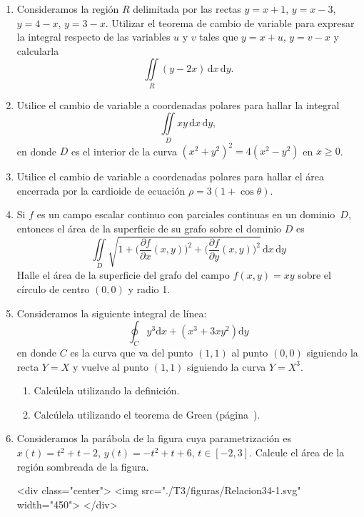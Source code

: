 \begin{enumerate}
\item
Consideramos la región $R$ delimitada por las rectas $y=x+1$, $y=x-3$, $y=4-x$, $y=3-x$.
Utilizar el teorema de cambio de variable para expresar la integral respecto de las variables $u$ y $v$ tales que $y=x+u$, $y=v-x$ y calcularla
\[
\iint\limits_R (y-2x)\,\mathrm dx\,\mathrm dy.
\]

\item
Utilice el cambio de variable a coordenadas polares para hallar la integral
\[
\iint\limits_{\mathit D} xy\,\mathrm dx\,\mathrm dy,
\]
en donde $\mathit D$ es el interior de la curva $(x^2+y^2)^2=4(x^2-y^2)$ en $x\geq 0$.

\item
Utilice el cambio de variable a coordenadas polares para hallar el área encerrada por la cardioide de ecuación $\rho=3(1+\cos\theta)$.


\item
Si $f$ es un campo escalar continuo con parciales continuas en un dominio~$\mathit D$, entonces el área de la superficie de su grafo sobre el dominio $\mathit D$ es
\[
\iint\limits_{\mathit D} \sqrt{1+\Big(\dfrac{\partial f}{\partial x}(x,y)\Big)^2+
\Big(\dfrac{\partial f}{\partial y}(x,y)\Big)^2}\,\mathrm dx\,\mathrm dy
\]
Halle el área de la superficie del grafo del campo $f(x,y)=xy$ sobre el círculo de centro $(0,0)$ y radio 1.


\item
Consideramos la siguiente integral de línea:
\[
\oint_C y^3\mathrm dx + (x^3+3xy^2)\mathrm dy
\]
en donde $C$ es la curva que va del punto $(1,1)$ al punto $(0,0)$ siguiendo la recta $Y=X$ y vuelve al punto $(1,1)$ siguiendo la curva $Y=X^3$.
\begin{enumerate}
\item
Calcúlela utilizando la definición.
\item
Calcúlela utilizando el teorema de Green (página~\pageref{th:green}).
\end{enumerate}


\item
Consideramos la parábola de la figura cuya parametrización es $x(t)=t^2+t-2$, $y(t)=-t^2+t+6$, $t\in[-2,3]$.
Calcule el área de la región sombreada de la figura.
\begin{latexonly}
\begin{center}
\end{center}
\end{latexonly}
\begin{rawhtml}
<div class="center">
<img src="./T3/figuras/Relacion34-1.svg" width="450">
</div>
\end{rawhtml}


\end{enumerate}
